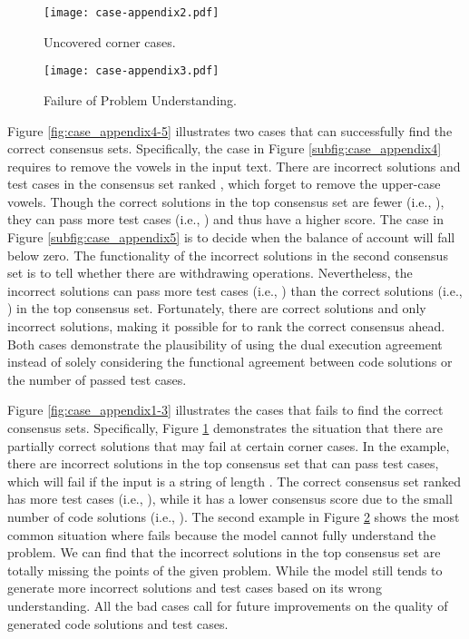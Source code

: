 \begin{figure*}[t]
	\centering
\begin{subfigure}[t]{0.95\linewidth}
		\centering
		\texttt{[image: case-appendix2.pdf]}
		\caption{Uncovered corner cases.}
		\label{subfig:case_appendix2}
	\end{subfigure}
	\begin{subfigure}[t]{0.95\linewidth}
		\centering
		\texttt{[image: case-appendix3.pdf]}
		\caption{Failure of Problem Understanding.}
		\label{subfig:case_appendix3}
	\end{subfigure}
	\caption{Three incorrect cases from the HumanEval benchmark, where \ours cannot find the correct consensus sets due to (a) uncovered corner cases, or (b) failure of problem understanding.}
	\label{fig:case_appendix1-3}
\end{figure*}


Figure \ref{fig:case_appendix4-5} illustrates two cases that \ours can successfully find the correct consensus sets. Specifically, the case in Figure \ref{subfig:case_appendix4} requires to remove the vowels in the input text. There are  incorrect solutions and  test cases in the consensus set ranked , which forget to remove the upper-case vowels. Though the correct solutions in the top  consensus set are fewer (i.e., ), they can pass more test cases (i.e., ) and thus have a higher score. The case in Figure \ref{subfig:case_appendix5} is to decide when the balance of account will fall below zero. The functionality of the incorrect solutions in the second consensus set is to tell whether there are withdrawing operations. Nevertheless, the incorrect solutions can pass more test cases (i.e., ) than the correct solutions (i.e., ) in the top  consensus set. Fortunately, there are  correct solutions and only  incorrect solutions, making it possible for \ours to rank the correct consensus ahead. Both cases demonstrate the plausibility of using the dual execution agreement instead of solely considering the functional agreement between code solutions or the number of passed test cases.

Figure \ref{fig:case_appendix1-3} illustrates the cases that \ours fails to find the correct consensus sets. Specifically, Figure \ref{subfig:case_appendix2} demonstrates the situation that there are partially correct solutions that may fail at certain corner cases. In the example, there are  incorrect solutions in the top  consensus set that can pass  test cases, which will fail if the input is a string of length . The correct consensus set ranked  has more test cases (i.e., ), while it has a lower consensus score due to the small number of code solutions (i.e., ). The second example in Figure \ref{subfig:case_appendix3} shows the most common situation where \ours fails because the model cannot fully understand the problem. We can find that the incorrect solutions in the top  consensus set are totally missing the points of the given problem. While the model still tends to generate more incorrect solutions and test cases based on its wrong understanding. All the bad cases call for future improvements on the quality of generated code solutions and test cases.


